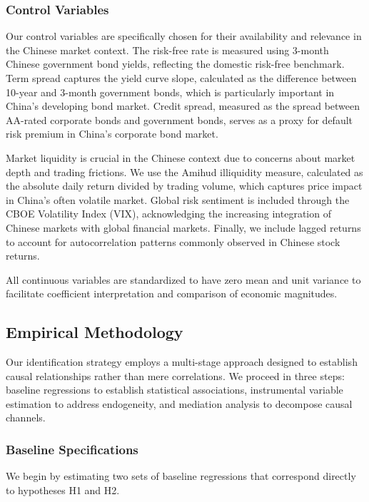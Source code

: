\documentclass[preprint,12pt,authoryear]{elsarticle}
\begin{document}
\subsubsection{Control Variables}

Our control variables are specifically chosen for their availability and relevance in the Chinese market context. The risk-free rate is measured using 3-month Chinese government bond yields, reflecting the domestic risk-free benchmark. Term spread captures the yield curve slope, calculated as the difference between 10-year and 3-month government bonds, which is particularly important in China's developing bond market. Credit spread, measured as the spread between AA-rated corporate bonds and government bonds, serves as a proxy for default risk premium in China's corporate bond market.

Market liquidity is crucial in the Chinese context due to concerns about market depth and trading frictions. We use the Amihud illiquidity measure, calculated as the absolute daily return divided by trading volume, which captures price impact in China's often volatile market. Global risk sentiment is included through the CBOE Volatility Index (VIX), acknowledging the increasing integration of Chinese markets with global financial markets. Finally, we include lagged returns to account for autocorrelation patterns commonly observed in Chinese stock returns.

All continuous variables are standardized to have zero mean and unit variance to facilitate coefficient interpretation and comparison of economic magnitudes.

\subsection{Empirical Methodology}

Our identification strategy employs a multi-stage approach designed to establish causal relationships rather than mere correlations. We proceed in three steps: baseline regressions to establish statistical associations, instrumental variable estimation to address endogeneity, and mediation analysis to decompose causal channels.

\subsubsection{Baseline Specifications}

We begin by estimating two sets of baseline regressions that correspond directly to hypotheses H1 and H2.
\end{document}
